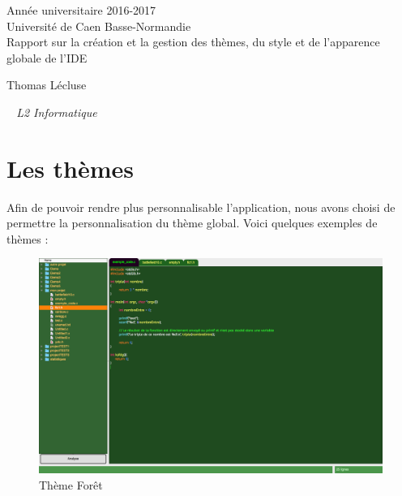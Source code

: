 \documentclass[a4paper,12pt]{article}
\begin{document}
\begin{titlepage}
	\begin{center}
		\Large{Année universitaire 2016-2017}\\
		\Large{Université de Caen Basse-Normandie}\\[1cm]
		
		\huge{Rapport sur la création et la gestion des thèmes, du style et de l'apparence globale de l'IDE}\\
		\vspace{3cm}
		
		Thomas Lécluse
		
	\normalsize{\textit{ ~ L2 Informatique}}\\
		\medskip
		\vspace{2cm}
		
	\end{center}
\end{titlepage}

\tableofcontents
\newpage

\section{Les thèmes}
	
	Afin de pouvoir rendre plus personnalisable l'application, nous avons choisi de permettre la personnalisation du thème global.
	Voici quelques exemples de thèmes : 
	
	
		\begin{figure}[h!]
			\begin{center}
				\includegraphics[scale=0.17]{imgs/theme_forest}
				\caption{Thème Forêt}
			\end{center}
		\end{figure}
		
\end{document}
